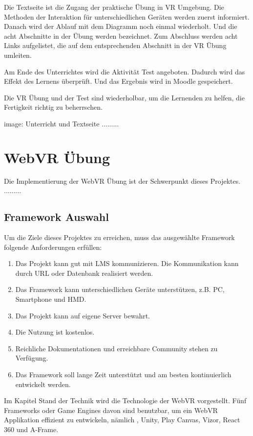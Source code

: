  Die Textseite ist die Zugang der praktische Übung in VR Umgebung. Die Methoden der Interaktion für unterschiedlichen Geräten werden zuerst informiert. Danach wird der Ablauf mit dem Diagramm noch einmal wiederholt. Und die acht Abschnitte in der Übung werden bezeichnet. Zum Abschluss werden acht Links aufgelistet, die auf dem entsprechenden Abschnitt in der VR Übung umleiten.
 
 Am Ende des Unterrichtes wird die Aktivität Test angeboten. Dadurch wird das Effekt des Lernens überprüft. Und das Ergebnis wird in Moodle gespeichert.
 
 Die VR Übung und der Test sind wiederholbar, um die Lernenden zu helfen, die Fertigkeit richtig zu beherrschen.
 
 image: Unterricht und Textseite .........
 
\section{WebVR Übung}
Die Implementierung der WebVR Übung ist der Schwerpunkt dieses Projektes. .........

 \subsection{Framework Auswahl}
 
 Um die Ziele dieses Projektes zu erreichen, muss das ausgewählte Framework folgende Anforderungen erfüllen:
 
 \begin{enumerate}
     \item Das Projekt kann gut mit LMS kommunizieren. Die Kommunikation kann durch URL oder Datenbank realisiert werden.
     \item Das Framework kann unterschiedlichen Geräte unterstützen, z.B. PC, Smartphone und HMD.
     \item Das Projekt kann auf eigene Server bewahrt.
     \item Die Nutzung ist kostenlos.
     \item Reichliche Dokumentationen und erreichbare Community stehen zu Verfügung.
     \item Das Framework soll lange Zeit unterstützt und am besten kontinuierlich entwickelt werden.
 \end{enumerate}
 
 Im Kapitel Stand der Technik wird die Technologie der WebVR vorgestellt. Fünf Frameworks oder Game Engines davon sind benutzbar, um ein WebVR Applikation effizient zu entwickeln, nämlich , Unity, Play Canvas, Vizor, React 360 und A-Frame.
 
